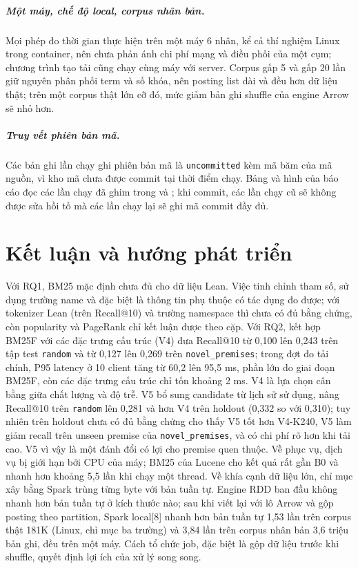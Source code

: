 \documentclass[11pt,a4paper,oneside]{report}
\newcommand{\code}[1]{\texttt{#1}}
\begin{document}
\paragraph{Một máy, chế độ local, corpus nhân bản.} Mọi phép đo thời gian thực hiện trên một máy 6 nhân, kể cả thí nghiệm
Linux trong container, nên chưa phản ánh chi phí mạng và điều phối của một cụm; chương trình tạo tải cũng chạy cùng máy với
server. Corpus gấp 5 và gấp 20 lần giữ nguyên phân phối term và số khóa, nên posting list dài và đều hơn dữ liệu thật; trên
một corpus thật lớn cỡ đó, mức giảm bản ghi shuffle của engine Arrow sẽ nhỏ hơn.

\paragraph{Truy vết phiên bản mã.} Các bản ghi lần chạy ghi phiên bản mã là \code{uncommitted} kèm mã băm của mã nguồn, vì
kho mã chưa được commit tại thời điểm chạy. Bảng và hình của báo cáo đọc các lần chạy đã ghim trong
 và ; khi commit, các lần chạy cũ sẽ không được sửa hồi
tố mà các lần chạy lại sẽ ghi mã commit đầy đủ.

\chapter{Kết luận và hướng phát triển}\label{sec:conclusion}

Với RQ1, BM25 mặc định chưa đủ cho dữ liệu Lean. Việc tinh chỉnh tham số, sử dụng trường name và đặc biệt là thông tin
phụ thuộc có tác dụng đo được; với tokenizer Lean (trên Recall@10) và trường namespace thì chưa có đủ bằng chứng, còn popularity và PageRank chỉ
kết luận được theo cặp. Với RQ2, kết hợp BM25F với các đặc trưng cấu trúc (V4) đưa Recall@10 từ 0,100 lên 0,243 trên tập
test \code{random} và từ 0,127 lên 0,269 trên \code{novel\_premises}; trong đợt đo tải chính, P95 latency ở 10 client tăng từ
60,2 lên 95,5 ms, phần lớn do giai đoạn BM25F, còn các đặc trưng cấu trúc chỉ tốn khoảng 2 ms. V4 là lựa chọn cân bằng giữa
chất lượng và độ trễ. V5 bổ sung candidate từ lịch sử sử dụng, nâng Recall@10 trên \code{random} lên 0,281 và hơn V4 trên
holdout (0,332 so với 0,310); tuy nhiên trên holdout chưa có đủ bằng chứng cho thấy V5 tốt hơn V4-K240, V5 làm giảm recall
trên unseen premise của \code{novel\_premises}, và có chi phí rõ hơn khi tải cao. V5 vì vậy là một đánh đổi có lợi cho
premise quen thuộc. Về phục vụ, dịch vụ bị giới hạn bởi CPU của máy; BM25 của Lucene cho kết quả rất gần B0 và nhanh hơn
khoảng 5,5 lần khi chạy một thread. Về khía cạnh dữ liệu lớn, chỉ mục xây
bằng Spark trùng từng byte với bản tuần tự. Engine RDD ban đầu không nhanh hơn bản tuần tự ở kích thước nào; sau khi viết
lại với lô Arrow và gộp posting theo partition, Spark local[8] nhanh hơn bản tuần tự 1,53 lần trên corpus thật 181K (Linux,
chỉ mục ba trường) và 3,84 lần trên corpus nhân bản 3,6 triệu bản ghi, đều trên một máy. Cách tổ chức job, đặc biệt là gộp
dữ liệu trước khi shuffle, quyết định lợi ích của xử lý song song.
\end{document}
